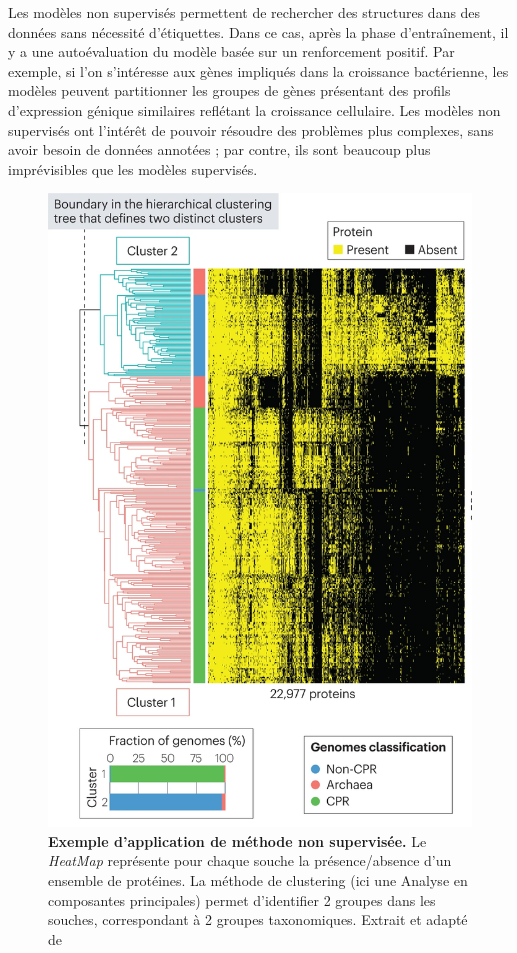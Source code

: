 Les modèles non supervisés permettent de rechercher des structures dans des données sans nécessité d'étiquettes. Dans ce cas, après la phase d’entraînement, il y a une autoévaluation du modèle basée sur un renforcement positif. Par exemple, si l'on s'intéresse aux gènes impliqués dans la croissance bactérienne, les modèles peuvent partitionner les groupes de gènes présentant des profils d'expression génique similaires reflétant la croissance cellulaire. Les modèles non supervisés ont l'intérêt de pouvoir résoudre des problèmes plus complexes, sans avoir besoin de données annotées ; par contre, ils sont beaucoup plus imprévisibles que les modèles supervisés.

\begin{figure}[htbp]
    \centering
    \includegraphics[width=0.5\linewidth]{images/hierachical_clustering.png}
    \caption[Exemple d'application de méthode non supervisé]{\textbf{Exemple d'application de méthode non supervisée.} Le \textit{HeatMap} représente pour chaque souche la présence/absence d'un ensemble de protéines. La méthode de clustering (ici une Analyse en composantes principales) permet d'identifier 2 groupes dans les souches, correspondant à 2 groupes taxonomiques. Extrait et adapté de \cite{asnicar_machine_2024}}
    \label{fig:enter-label}
\end{figure}

